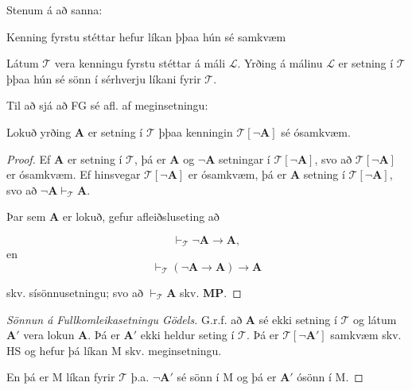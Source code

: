 \documentclass[12pt]{article}
\begin{document}
Stenum á að sanna:

\begin{setn}[Meginsetning]
  Kenning fyrstu stéttar hefur líkan þþaa hún sé samkvæm
\end{setn}

\begin{setn}
  Látum $\mathcal{T}$ vera kenningu fyrstu stéttar á máli $\mathcal{L}$.
  Yrðing á málinu $\mathcal{L}$ er setning í $\mathcal{T}$ þþaa
  hún sé sönn í sérhverju líkani fyrir $\mathcal{T}$.
\end{setn}

Til að sjá að FG sé afl. af meginsetningu:

\begin{setn}[Hjálparsetning]
 Lokuð yrðing $\mathbf{A}$ er setning í $\mathcal{T}$ þþaa
 kenningin $\mathcal{T}[\lnot \mathbf{A}]$ sé ósamkvæm.
\end{setn}




\begin{proof}
 Ef $\mathbf{A}$  er setning í $\mathcal{T}$, þá er $\mathbf{A}$ og $\lnot \mathbf{A}$
 setningar í $\mathcal{T}[\lnot \mathbf{A}]$, svo að
 $\mathcal{T}[\lnot \mathbf{A}]$ er ósamkvæm. Ef hinsvegar
 $\mathcal{T}[\lnot \mathbf{A}]$ er  ósamkvæm, þá er $\mathbf{A}$
 setning í $\mathcal{T}[\lnot \mathbf{A}]$, svo að
 $\lnot \mathbf{A} \vdash_{\mathcal{T}} \mathbf{A}$.

 Þar sem $\mathbf{A}$ er lokuð, gefur afleiðsluseting að

 \[\vdash_{\mathcal{T}} \lnot \mathbf{A} \rightarrow \mathbf{A},\]
 en \[ \vdash_{\mathcal{T}} ( \lnot \mathbf{A} \rightarrow \mathbf{A}) \rightarrow \mathbf{A}\]

 skv. sísönnusetningu; svo að $\vdash_{\mathcal{T}} \mathbf{A}$ skv. \textbf{MP}.

\end{proof}

\begin{proof}[Sönnun á Fullkomleikasetningu Gödels]
  G.r.f. að $\mathbf{A}$ sé ekki setning í $\mathcal{T}$ og látum $\mathbf{A}'$
  vera lokun $\mathbf{A}$. Þá er $\mathbf{A}'$ ekki heldur seting í
  $\mathcal{T}$. Þá er $\mathcal{T}[\lnot \mathbf{A}']$ samkvæm skv. HS og hefur
  þá líkan M skv. meginsetningu.

  En þá er M líkan fyrir $\mathcal{T}$ þ.a. $\lnot \mathbf{A}'$ sé sönn í M
  og þá er $\mathbf{A}'$ ósönn í M.
  
\end{proof}
\end{document}
